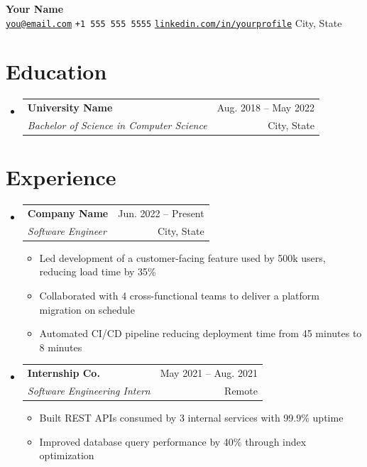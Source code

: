 \documentclass[letterpaper,11pt]{article}
\makeatletter
\newcommand{\resumeItem}[1]{
  \item\small{#1 \vspace{-1pt}}
}
\newcommand{\resumeSubheading}[4]{
  \vspace{-1pt}\item
    \begin{tabular*}{\textwidth}[t]{l@{\extracolsep{\fill}}r}
      \textbf{\color{textbase}#1} & {\color{midgray}\small #2} \\
      \textit{\small\color{darkgray}#3} & {\color{midgray}\small #4} \\
    \end{tabular*}\vspace{-4pt}
}
\newcommand{\resumeSubHeadingListStart}{\begin{itemize}[leftmargin=0in,label={}]}
\newcommand{\resumeSubHeadingListEnd}{\end{itemize}}
\newcommand{\resumeItemListStart}{\begin{itemize}[nosep,leftmargin=0.15in,label={\color{tealprimary}\small\textbullet}]}
\newcommand{\resumeItemListEnd}{\end{itemize}\vspace{0pt}}
\makeatother
\begin{document}
\begin{center}
    {\Huge\bfseries\color{tealprimary} Your Name} \\[4pt]
    \small
    \href{mailto:you@email.com}{\texttt{you@email.com}}
    \hspace{4pt}{\color{tealprimary}|}\hspace{4pt}
    \texttt{+1 555 555 5555}
    \hspace{4pt}{\color{tealprimary}|}\hspace{4pt}
    \href{https://linkedin.com/in/yourprofile}{\texttt{linkedin.com/in/yourprofile}}
    \hspace{4pt}{\color{tealprimary}|}\hspace{4pt}
    City, State
\end{center}

\vspace{-6pt}

\section{Education}
\resumeSubHeadingListStart

\resumeSubheading
{University Name}{Aug. 2018 -- May 2022}
{Bachelor of Science in Computer Science}{City, State}

\resumeSubHeadingListEnd

\section{Experience}
\resumeSubHeadingListStart

\resumeSubheading
{Company Name}{Jun. 2022 -- Present}
{Software Engineer}{City, State}
\resumeItemListStart
\resumeItem{Led development of a customer-facing feature used by 500k users, reducing load time by 35\%}
\resumeItem{Collaborated with 4 cross-functional teams to deliver a platform migration on schedule}
\resumeItem{Automated CI/CD pipeline reducing deployment time from 45 minutes to 8 minutes}
\resumeItemListEnd

\resumeSubheading
{Internship Co.}{May 2021 -- Aug. 2021}
{Software Engineering Intern}{Remote}
\resumeItemListStart
\resumeItem{Built REST APIs consumed by 3 internal services with 99.9\% uptime}
\resumeItem{Improved database query performance by 40\% through index optimization}
\resumeItemListEnd

\resumeSubHeadingListEnd
\end{document}
